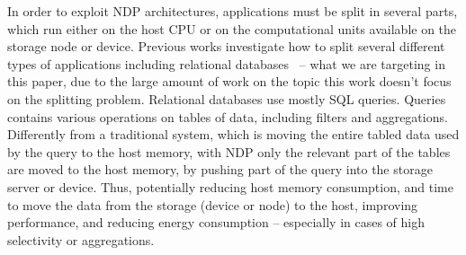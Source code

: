  In order to exploit NDP architectures, applications must be split in several parts, which run either on the host CPU or on the computational units available on the storage node or device.
Previous works investigate how to split several different types of applications including relational databases~\cite{DBtoaster,Gu:2016:BFN:3001136.3001154} -- what we are targeting in this paper, due to the large amount of work on the topic this work doesn't focus on the splitting problem.
Relational databases use mostly SQL queries. Queries contains various operations on tables of data, including filters and aggregations.
Differently from a traditional system, which is moving the entire tabled data used by the query to the host memory, with NDP only the relevant part of the tables are moved to the host memory, by pushing part of the query into the storage server or device.
Thus, potentially reducing host memory consumption, and time to move the data from the storage (device or node) to the host, improving performance, and reducing energy consumption -- especially in cases of high selectivity or aggregations.

\fi